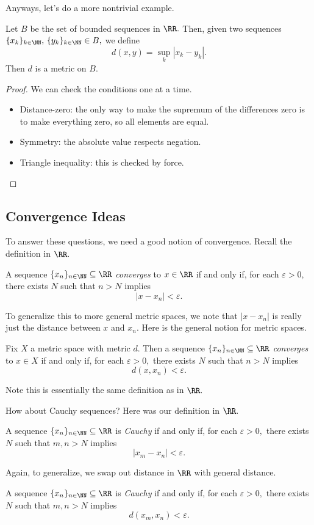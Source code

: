 \documentclass[../notes.tex]{subfiles}
\begin{document}
Anyways, let's do a more nontrivial example.
\begin{exercise}[Ross 13.3]
	Let $B$ be the set of bounded sequences in $\RR.$ Then, given two sequences $\{x_k\}_{k\in\NN},\,\{y_k\}_{k\in\NN}\in B,$ we define
	\[d(x,y)=\sup_k|x_k-y_k|.\]
	Then $d$ is a metric on $B.$
\end{exercise}
\begin{proof}
	We can check the conditions one at a time.
	\begin{itemize}
		\item Distance-zero: the only way to make the supremum of the differences zero is to make everything zero, so all elements are equal.
		\item Symmetry: the absolute value respects negation.
		\item Triangle inequality: this is checked by force.
		\qedhere
	\end{itemize}
\end{proof}

\subsection{Convergence Ideas}
To answer these questions, we need a good notion of convergence. Recall the definition in $\RR.$
\begin{definition}
	A sequence $\{x_n\}_{n\in\NN}\subseteq\RR$ \textit{converges} to $x\in\RR$ if and only if, for each $\varepsilon>0,$ there exists $N$ such that $n>N$ implies
	\[|x-x_n|<\varepsilon.\]
\end{definition}
To generalize this to more general metric spaces, we note that $|x-x_n|$ is really just the distance between $x$ and $x_n.$ Here is the general notion for metric spaces.
\begin{definition}
	Fix $X$ a metric space with metric $d.$ Then a sequence $\{x_n\}_{n\in\NN}\subseteq\RR$ \textit{converges} to $x\in X$ if and only if, for each $\varepsilon>0,$ there exists $N$ such that $n>N$ implies
	\[d(x,x_n)<\varepsilon.\]
\end{definition}
Note this is essentially the same definition as in $\RR.$

How about Cauchy sequences? Here was our definition in $\RR.$
\begin{definition}
	A sequence $\{x_n\}_{n\in\NN}\subseteq\RR$ is \textit{Cauchy} if and only if, for each $\varepsilon>0,$ there exists $N$ such that $m,n>N$ implies
	\[|x_m-x_n|<\varepsilon.\]
\end{definition}
Again, to generalize, we swap out distance in $\RR$ with general distance.
\begin{definition}
	A sequence $\{x_n\}_{n\in\NN}\subseteq\RR$ is \textit{Cauchy} if and only if, for each $\varepsilon>0,$ there exists $N$ such that $m,n>N$ implies
	\[d(x_m,x_n)<\varepsilon.\]
\end{definition}
\end{document}
